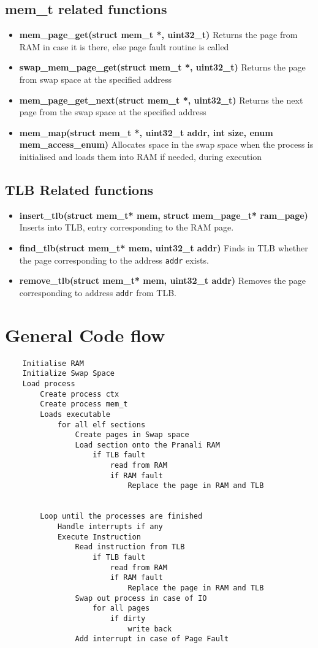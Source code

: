 \documentclass[paper=a4, fontsize=11pt,twoside]{scrartcl}   %
\begin{document}
\subsection{mem\_t related functions}
\begin{itemize}
\item \textbf{mem\_page\_get(struct mem\_t *, uint32\_t)} Returns the page from RAM in case it is there, else page fault routine is called
\item \textbf{swap\_mem\_page\_get(struct mem\_t *, uint32\_t)} Returns the page from swap space at the specified address
\item \textbf{mem\_page\_get\_next(struct mem\_t *, uint32\_t)} Returns the next page from the swap space at the specified address
\item \textbf{mem\_map(struct mem\_t *, uint32\_t addr, int size, enum mem\_access\_enum)} Allocates space in the swap space when the process is initialised and loads them into RAM if needed, during execution
\end{itemize}

\subsection{TLB Related functions}
\begin{itemize}
\item \textbf{insert\_tlb(struct mem\_t* mem, struct mem\_page\_t* ram\_page)} Inserts into TLB, entry corresponding to the RAM page.
\item \textbf{find\_tlb(struct mem\_t* mem, uint32\_t addr)} Finds in TLB whether the page corresponding to the address \texttt{addr} exists.
\item \textbf{remove\_tlb(struct mem\_t* mem, uint32\_t addr)} Removes the page corresponding to address \texttt{addr} from TLB.
\end{itemize}
\newpage
\section{General Code flow}
\begin{verbatim}
    Initialise RAM
    Initialize Swap Space
    Load process 
        Create process ctx
        Create process mem_t 
        Loads executable
            for all elf sections
                Create pages in Swap space
                Load section onto the Pranali RAM
                    if TLB fault
                        read from RAM
                        if RAM fault 
                            Replace the page in RAM and TLB
                

        Loop until the processes are finished
            Handle interrupts if any
            Execute Instruction
                Read instruction from TLB
                    if TLB fault
                        read from RAM
                        if RAM fault 
                            Replace the page in RAM and TLB
                Swap out process in case of IO
                    for all pages
                        if dirty 
                            write back
                Add interrupt in case of Page Fault

\end{verbatim}
\end{document}
